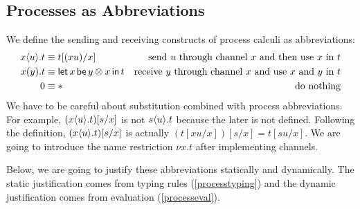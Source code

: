     \subsection{Processes as Abbreviations}

    We define the sending and receiving constructs of process calculi as
    abbreviations:
    \begin{align*}
     {x}\langle{u}\rangle.{t} &\equiv t[(xu) /x] &\text{send $u$ through channel
     $x$ and then use $x$ in $t$} \\
     {{x}({y}).{t}} &\equiv \mathsf{let }\,{x}\,\mathsf{ be }\,{y\otimes x}\,\mathsf{ in }\,{t} & \text{receive
     $y$ through channel $x$ and use $x$ and $y$ in $t$} \\
     0 &\equiv \ast &\text{do nothing}
    \end{align*}
    We have to be careful about substitution combined with process
    abbreviations.
    For example, $({x}\langle{u}\rangle.{t})[s/x]$ is not ${s}\langle{u}\rangle.{t}$
    because the later is not defined.  Following the definition,
    $({x}\langle{u}\rangle.{t})[s/x]$ is actually $(t[xu/x])[s/x] = t[su/x]$.
    We are going to introduce the name restriction $\nu x.t$ after
    implementing channels.

    Below, we are going to justify these abbreviations statically and
    dynamically.
    The static justification comes from typing rules
    (\ref{processtyping}) and the dynamic justification comes from
    evaluation (\ref{processeval}).

